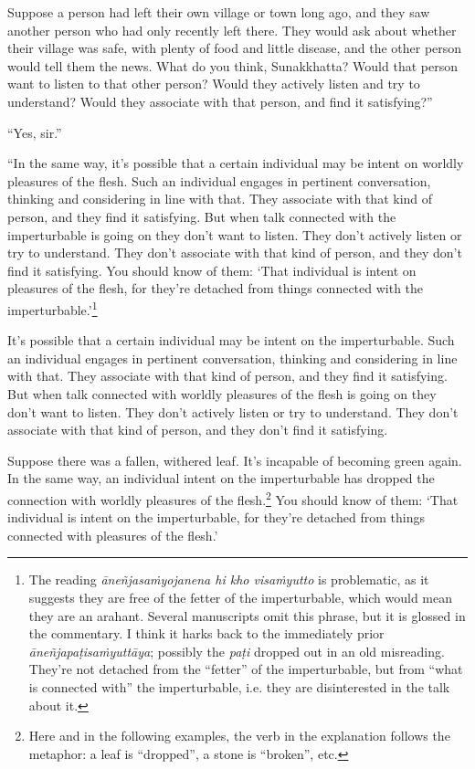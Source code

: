 \documentclass[12pt,openany]{book}%
\begin{document}
Suppose a person had left their own village or town long ago, and they saw another person who had only recently left there. They would ask about whether their village was safe, with plenty of food and little disease, and the other person would tell them the news. What do you think, Sunakkhatta? Would that person want to listen to that other person? Would they actively listen and try to understand? Would they associate with that person, and find it satisfying?” 

“Yes, sir.” 

“In the same way, it’s possible that a certain individual may be intent on worldly pleasures of the flesh. Such an individual engages in pertinent conversation, thinking and considering in line with that. They associate with that kind of person, and they find it satisfying. But when talk connected with the imperturbable is going on they don’t want to listen. They don’t actively listen or try to understand. They don’t associate with that kind of person, and they don’t find it satisfying. You should know of them: ‘That individual is intent on pleasures of the flesh, for they’re detached from things connected with the imperturbable.’\footnote{The reading \textit{\textsanskrit{āneñjasaṁyojanena} hi kho \textsanskrit{visaṁyutto}} is problematic, as it suggests they are free of the fetter of the imperturbable, which would mean they are an arahant. Several manuscripts omit this phrase, but it is glossed in the commentary. I think it harks back to the immediately prior \textit{\textsanskrit{āneñjapaṭisaṁyuttāya}}; possibly the \textit{\textsanskrit{paṭi}} dropped out in an old misreading. They’re not detached from the “fetter” of the imperturbable, but from “what is connected with” the imperturbable, i.e. they are disinterested in the talk about it. } 

It’s possible that a certain individual may be intent on the imperturbable. Such an individual engages in pertinent conversation, thinking and considering in line with that. They associate with that kind of person, and they find it satisfying. But when talk connected with worldly pleasures of the flesh is going on they don’t want to listen. They don’t actively listen or try to understand. They don’t associate with that kind of person, and they don’t find it satisfying. 

Suppose there was a fallen, withered leaf. It’s incapable of becoming green again. In the same way, an individual intent on the imperturbable has dropped the connection with worldly pleasures of the flesh.\footnote{Here and in the following examples, the verb in the explanation follows the metaphor: a leaf is “dropped”, a stone is “broken”, etc. } You should know of them: ‘That individual is intent on the imperturbable, for they’re detached from things connected with pleasures of the flesh.’ 
\end{document}
